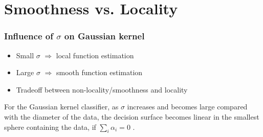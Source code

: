 \section{Smoothness vs. Locality}

\begin{frame}
	\frametitle{Influence of $\sigma$ on Gaussian kernel}
	\begin{itemize}
		\item Small $\sigma$ $\Rightarrow$ local function estimation
		\item Large $\sigma$ $\Rightarrow$ smooth function estimation
		\item Tradeoff between non-locality/smoothness and locality
	\end{itemize}
	
	\begin{theorem}
		For the Gaussian kernel classifier, as $\sigma$ increases and becomes large compared with the diameter of the data, the decision surface becomes linear in the smallest sphere containing the data, if $\sum_{i}\alpha_i = 0$ \cite{Bengio:06}.
	\end{theorem}
\end{frame}

